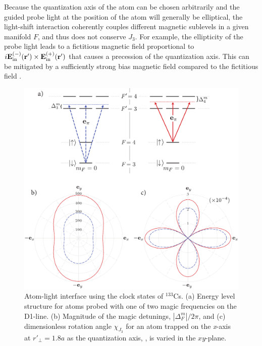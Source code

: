 \documentclass[aps,pra,twocolumn]{revtex4-1} %
\newcommand{\inp}{{\rm in}}
\newcommand{\chieff}{\chi_{J_3}}
\begin{document}
Because the quantization axis of the atom can be chosen arbitrarily and the guided probe light at the position of the atom will generally be elliptical, the light-shift interaction coherently couples different magnetic sublevels in a given manifold $F$, and thus does not conserve $J_3$.  For example, the ellipticity of the probe light leads to a fictitious magnetic field proportional to $i \mathbf{E}^{(-)}_{\inp}(\br') \times \mathbf{E}^{(+)}_{\inp}(\br')$ that causes a precession of the quantization axis.  This can be mitigated by a sufficiently strong bias magnetic field compared to the fictitious field \cite{smith_continuous_2004}. 


\begin{figure}
\includegraphics[scale=0.44]{./Figs/Fig_MagicFrequencies_alt}
\caption{Atom-light interface using the clock states of $^{133}$Cs.  
(a) Energy level structure for atoms probed with one of two magic frequencies on the D1-line. 
(b) Magnitude of the magic detunings, $|\Delta^m_{F}|/2\pi$, and (c) dimensionless rotation angle $\chieff$ for an atom trapped on the \emph{x}-axis at $ r'\!_\perp=1.8a $ as the quantization axis, , is varied in the $xy$-plane. }\label{Fig::CouplingStrength}
\end{figure}
\end{document}
